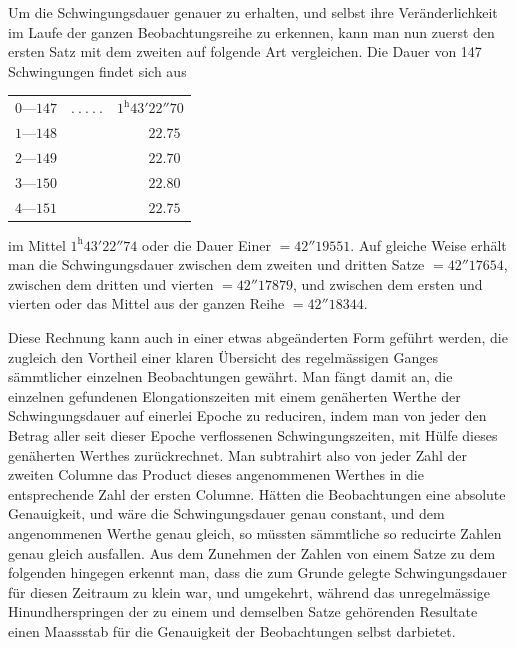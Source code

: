 Um die Schwingungsdauer genauer zu erhalten, und selbst ihre Veränderlichkeit im Laufe der ganzen Beobachtungsreihe zu erkennen, kann man nun zuerst den ersten Satz mit dem zweiten auf folgende Art vergleichen. Die Dauer von 147 Schwingungen findet sich aus
\begin{center}
\begin{tabular}{rcl}
$0\text{—}147$ & $.\ .\ .\ .\ .$ & $1^{\mathrm{h}}43'22''70$\\
$1\text{—}148$ & & $\phantom{1^{\mathrm{h}}43'}22.75$\\
$2\text{—}149$ & & $\phantom{1^{\mathrm{h}}43'}22.70$\\
$3\text{—}150$ & & $\phantom{1^{\mathrm{h}}43'}22.80$\\
$4\text{—}151$ & & $\phantom{1^{\mathrm{h}}43'}22.75$
\end{tabular}
\end{center}
im Mittel $1^{\mathrm{h}}43'22''74$ oder die Dauer Einer $=42''19551$. Auf gleiche Weise erhält man die Schwingungsdauer zwischen dem zweiten und dritten Satze $=42''17654$, zwischen dem dritten und vierten $=42''17879$, und zwischen dem ersten und vierten oder das Mittel aus der ganzen Reihe $=42''18344$.

Diese Rechnung kann auch in einer etwas abgeänderten Form geführt werden, die zugleich den Vortheil einer klaren Übersicht des regelmässigen Ganges sämmtlicher einzelnen Beobachtungen gewährt. Man fängt damit an, die einzelnen gefundenen Elongationszeiten mit einem genäherten Werthe der Schwingungsdauer auf einerlei Epoche zu reduciren, indem man von jeder den Betrag aller seit dieser Epoche verflossenen Schwingungszeiten, mit Hülfe dieses genäherten Werthes zurückrechnet. Man subtrahirt also von jeder Zahl der zweiten
Columne das Product dieses angenommenen Werthes in die entsprechende Zahl der ersten Columne. Hätten die Beobachtungen eine absolute Genauigkeit, und wäre die Schwingungsdauer genau constant, und dem angenommenen Werthe genau gleich, so müssten sämmtliche so reducirte Zahlen genau gleich ausfallen. Aus dem Zunehmen der Zahlen von einem Satze zu dem folgenden hingegen erkennt man, dass die zum Grunde gelegte Schwingungsdauer für diesen Zeitraum zu klein war, und umgekehrt, während das unregelmässige Hinundherspringen der zu einem und demselben Satze gehörenden Resultate einen Maassstab für die Genauigkeit der Beobachtungen selbst darbietet.

